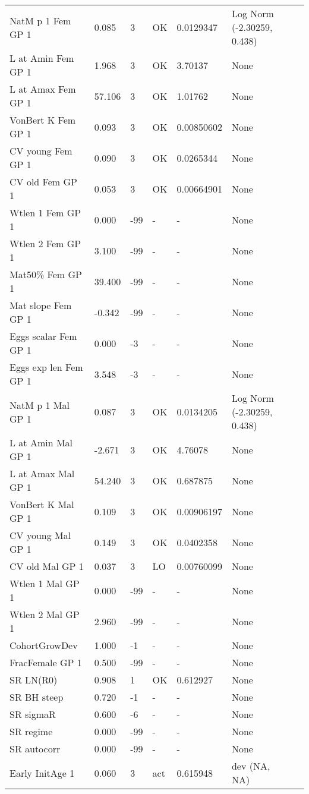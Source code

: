 \documentclass[11pt,
  english,
  a4paper,
]{article}
\begin{document}
\begin{landscape}
\begin{longtable}[t]{>{\raggedright\arraybackslash}p{6cm}lllll>{\raggedright\arraybackslash}p{4cm}}
\endfoot
\bottomrule
\endlastfoot
NatM p 1 Fem GP 1 & 0.085 & 3 & OK & 0.0129347 & Log Norm (-2.30259, 0.438)\\
L at Amin Fem GP 1 & 1.968 & 3 & OK & 3.70137 & None\\
L at Amax Fem GP 1 & 57.106 & 3 & OK & 1.01762 & None\\
VonBert K Fem GP 1 & 0.093 & 3 & OK & 0.00850602 & None\\
CV young Fem GP 1 & 0.090 & 3 & OK & 0.0265344 & None\\
CV old Fem GP 1 & 0.053 & 3 & OK & 0.00664901 & None\\
Wtlen 1 Fem GP 1 & 0.000 & -99 & - & - & None\\
Wtlen 2 Fem GP 1 & 3.100 & -99 & - & - & None\\
Mat50\% Fem GP 1 & 39.400 & -99 & - & - & None\\
Mat slope Fem GP 1 & -0.342 & -99 & - & - & None\\
Eggs scalar Fem GP 1 & 0.000 & -3 & - & - & None\\
Eggs exp len Fem GP 1 & 3.548 & -3 & - & - & None\\
NatM p 1 Mal GP 1 & 0.087 & 3 & OK & 0.0134205 & Log Norm (-2.30259, 0.438)\\
L at Amin Mal GP 1 & -2.671 & 3 & OK & 4.76078 & None\\
L at Amax Mal GP 1 & 54.240 & 3 & OK & 0.687875 & None\\
VonBert K Mal GP 1 & 0.109 & 3 & OK & 0.00906197 & None\\
CV young Mal GP 1 & 0.149 & 3 & OK & 0.0402358 & None\\
CV old Mal GP 1 & 0.037 & 3 & LO & 0.00760099 & None\\
Wtlen 1 Mal GP 1 & 0.000 & -99 & - & - & None\\
Wtlen 2 Mal GP 1 & 2.960 & -99 & - & - & None\\
CohortGrowDev & 1.000 & -1 & - & - & None\\
FracFemale GP 1 & 0.500 & -99 & - & - & None\\
SR LN(R0) & 0.908 & 1 & OK & 0.612927 & None\\
SR BH steep & 0.720 & -1 & - & - & None\\
SR sigmaR & 0.600 & -6 & - & - & None\\
SR regime & 0.000 & -99 & - & - & None\\
SR autocorr & 0.000 & -99 & - & - & None\\
Early InitAge 1 & 0.060 & 3 & act & 0.615948 & dev (NA, NA)\\

\end{longtable}
\end{landscape}
\end{document}
